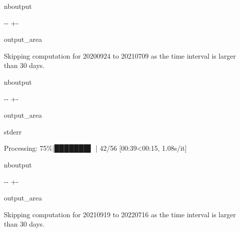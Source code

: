 \documentclass[letterpaper,10pt,english]{sphinxmanual}
\begin{document}
\begin{sphinxuseclass}{nboutput}
{

\kern-\sphinxverbatimsmallskipamount\kern-\baselineskip
\kern+\FrameHeightAdjust\kern-\fboxrule
\vspace{\nbsphinxcodecellspacing}

\begin{sphinxuseclass}{output_area}
\begin{sphinxuseclass}{}


\begin{sphinxVerbatim}[commandchars=\\\{\}]
Skipping computation for 20200924 to 20210709 as the time interval is larger than 30 days.
\end{sphinxVerbatim}



\end{sphinxuseclass}
\end{sphinxuseclass}
}

\end{sphinxuseclass}
\begin{sphinxuseclass}{nboutput}
{

\kern-\sphinxverbatimsmallskipamount\kern-\baselineskip
\kern+\FrameHeightAdjust\kern-\fboxrule
\vspace{\nbsphinxcodecellspacing}

\begin{sphinxuseclass}{output_area}
\begin{sphinxuseclass}{stderr}


\begin{sphinxVerbatim}[commandchars=\\\{\}]
Processing:  75\%|███████▌  | 42/56 [00:39<00:15,  1.08s/it]
\end{sphinxVerbatim}



\end{sphinxuseclass}
\end{sphinxuseclass}
}

\end{sphinxuseclass}
\begin{sphinxuseclass}{nboutput}
{

\kern-\sphinxverbatimsmallskipamount\kern-\baselineskip
\kern+\FrameHeightAdjust\kern-\fboxrule
\vspace{\nbsphinxcodecellspacing}

\begin{sphinxuseclass}{output_area}
\begin{sphinxuseclass}{}


\begin{sphinxVerbatim}[commandchars=\\\{\}]
Skipping computation for 20210919 to 20220716 as the time interval is larger than 30 days.
\end{sphinxVerbatim}



\end{sphinxuseclass}
\end{sphinxuseclass}
}

\end{sphinxuseclass}
\end{document}
